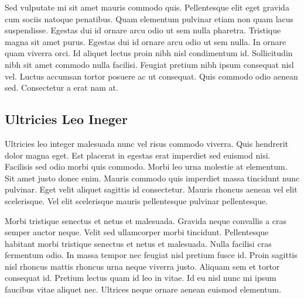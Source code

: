 \documentclass[12pt,a4paper,oneside]{book}
\begin{document}
Sed vulputate mi sit amet mauris commodo quis. Pellentesque elit eget gravida cum sociis natoque penatibus. Quam elementum pulvinar etiam non quam lacus suspendisse. Egestas dui id ornare arcu odio ut sem nulla pharetra. Tristique magna sit amet purus. Egestas dui id ornare arcu odio ut sem nulla. In ornare quam viverra orci. Id aliquet lectus proin nibh nisl condimentum id. Sollicitudin nibh sit amet commodo nulla facilisi. Feugiat pretium nibh ipsum consequat nisl vel. Luctus accumsan tortor posuere ac ut consequat. Quis commodo odio aenean sed. Consectetur a erat nam at.

\subsection{Ultricies Leo Ineger}

Ultricies leo integer malesuada nunc vel risus commodo viverra. Quis hendrerit dolor magna eget. Est placerat in egestas erat imperdiet sed euismod nisi. Facilisis sed odio morbi quis commodo. Morbi leo urna molestie at elementum. Sit amet justo donec enim. Mauris commodo quis imperdiet massa tincidunt nunc pulvinar. Eget velit aliquet sagittis id consectetur. Mauris rhoncus aenean vel elit scelerisque. Vel elit scelerisque mauris pellentesque pulvinar pellentesque.

Morbi tristique senectus et netus et malesuada. Gravida neque convallis a cras semper auctor neque. Velit sed ullamcorper morbi tincidunt. Pellentesque habitant morbi tristique senectus et netus et malesuada. Nulla facilisi cras fermentum odio. In massa tempor nec feugiat nisl pretium fusce id. Proin sagittis nisl rhoncus mattis rhoncus urna neque viverra justo. Aliquam sem et tortor consequat id. Pretium lectus quam id leo in vitae. Id eu nisl nunc mi ipsum faucibus vitae aliquet nec. Ultrices neque ornare aenean euismod elementum.

\newpage
\printbibliography
\newpage
\printindex

\end{document}
